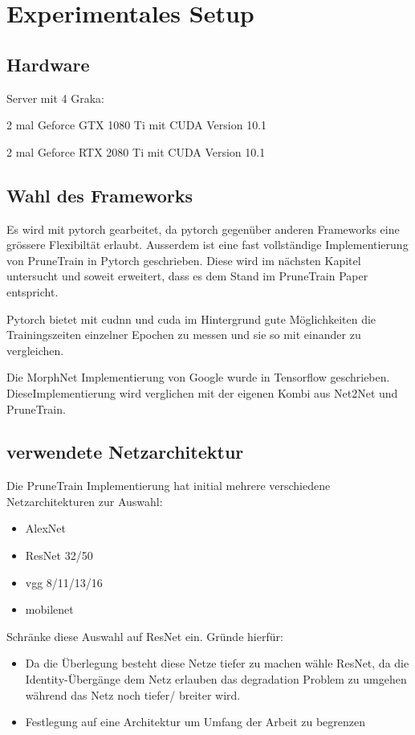 \section{Experimentales Setup}\label{sec:setup}

\subsection{Hardware}
Server mit 4 Graka:

2 mal Geforce GTX 1080 Ti mit CUDA Version 10.1 

2 mal Geforce RTX 2080 Ti mit CUDA Version 10.1

\subsection{Wahl des Frameworks}

Es wird mit pytorch gearbeitet, da pytorch gegenüber anderen Frameworks eine grössere Flexibiltät erlaubt. Ausserdem ist eine fast vollständige Implementierung von PruneTrain in Pytorch geschrieben. Diese wird im nächsten Kapitel untersucht und soweit erweitert, dass es dem Stand im PruneTrain Paper entspricht.

Pytorch bietet mit cudnn und cuda im Hintergrund gute Möglichkeiten die Trainingszeiten einzelner Epochen zu messen und sie so mit einander zu vergleichen.


Die MorphNet Implementierung von Google wurde in Tensorflow geschrieben. DieseImplementierung wird verglichen mit der eigenen Kombi aus Net2Net und PruneTrain.


\subsection{verwendete Netzarchitektur}\label{sec:archi}
Die PruneTrain Implementierung hat initial mehrere verschiedene Netzarchitekturen zur Auswahl:
\begin{itemize}
 \item AlexNet
 \item ResNet 32/50
 \item vgg 8/11/13/16
 \item mobilenet
\end{itemize}

Schränke diese Auswahl auf ResNet ein.
Gründe hierfür:
\begin{itemize}
 \item Da die Überlegung besteht diese Netze tiefer zu machen wähle ResNet, da die Identity-Übergänge dem Netz erlauben das degradation Problem zu umgehen während das Netz noch tiefer/ breiter wird.
 \item Festlegung auf eine Architektur um Umfang der Arbeit zu begrenzen
\end{itemize}

